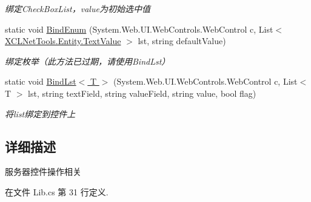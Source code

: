 \begin{DoxyCompactItemize}
\begin{DoxyCompactList}\small\item\em 绑定\-Check\-Box\-List，value为初始选中值 \end{DoxyCompactList}\item 
static void \hyperlink{class_x_c_l_net_tools_1_1_control_1_1_server_control_1_1_lib_acf0e494ba2e94742818fbebfd883ab17}{Bind\-Enum} (System.\-Web.\-U\-I.\-Web\-Controls.\-Web\-Control c, List$<$ \hyperlink{class_x_c_l_net_tools_1_1_entity_1_1_text_value}{X\-C\-L\-Net\-Tools.\-Entity.\-Text\-Value} $>$ lst, string default\-Value)
\begin{DoxyCompactList}\small\item\em 绑定枚举（此方法已过期，请使用\-Bind\-Lst） \end{DoxyCompactList}\item 
static void \hyperlink{class_x_c_l_net_tools_1_1_control_1_1_server_control_1_1_lib_ad5ebfd4eb97120e0049cd0260e150ed9}{Bind\-Lst$<$ T $>$} (System.\-Web.\-U\-I.\-Web\-Controls.\-Web\-Control c, List$<$ T $>$ lst, string text\-Field, string value\-Field, string value, bool flag)
\begin{DoxyCompactList}\small\item\em 将list绑定到控件上 \end{DoxyCompactList}\end{DoxyCompactItemize}


\subsection{详细描述}
服务器控件操作相关 



在文件 Lib.\-cs 第 31 行定义.



